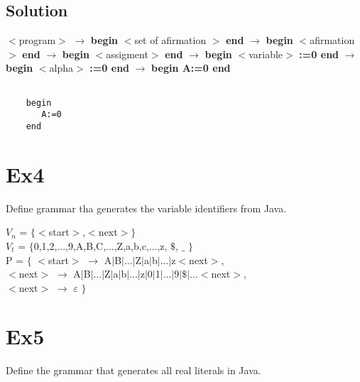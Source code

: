 \documentclass[12pt]{article}
\begin{document}
\subsection*{Solution}

$<$program$>$ $\to$ \textbf{begin} $<$set of afirmation $>$ \textbf{end} $\to$ \textbf{begin} $<$afirmation$>$ \textbf{end} $\to$ \textbf{begin} $<$assigment$>$ \textbf{end} $\to$ \textbf{begin} $<$variable$>$ \textbf{:=0 end} $\to$ \textbf{begin} $<$alpha$>$ \textbf{:=0 end} $\to$ \textbf{begin A:=0 end}

\begin{verbatim}
   
    begin
       A:=0
    end
\end{verbatim}

\newpage



\section*{Ex4}
Define grammar tha generates the variable identifiers from Java.
\begin{center}
    $V_n$ = $\{<$start$>$,$<$next$>\}$ \\
    $V_t$ = $\{$0,1,2,...,9,A,B,C,...,Z,a,b,c,...,z, $\$$, $\_$  $\}$ \\
    P = $\{ $ $<$start$>$ $\to$ A$|$B$|$...$|$Z$|$a$|$b$|$...$|$z$<$next$>$, \\
    $<$next$>$ $\to$ A$|$B$|$...$|$Z$|$a$|$b$|$...$|$z$|$0$|$1$|$...$|$9$|$$\$$$|$...$<$next$>$, \\
    $<$next$>$ $\to$ $\varepsilon$ $\}$
\end{center}




\section*{Ex5}
Define the grammar that generates all real literals in Java.
\end{document}
